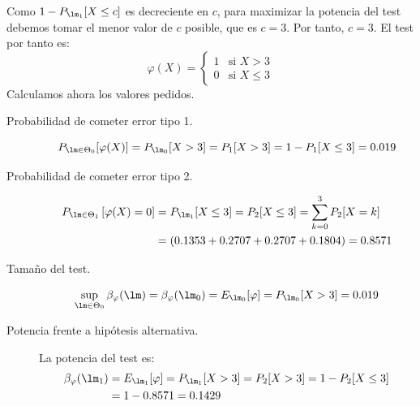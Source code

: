 \begin{ejercicio}
\begin{enumerate}[label=\alph*)]
            Como $1-P_{\lm_1}[X\leq c]$ es decreciente en $c$, para maximizar la potencia del test debemos tomar el menor valor de $c$ posible, que es $c=3$. Por tanto, $c=3$. El test por tanto es:
            \begin{equation*}
                \varphi(X) = \left\{\begin{array}{ll}
                    1 & \text{si\ } X> 3 \\
                    0 & \text{si\ } X \leq 3
                \end{array}\right. 
            \end{equation*}
            Calculamos ahora los valores pedidos.
            \begin{description}
                \item [Probabilidad de cometer error tipo 1.] 
                    \begin{equation*}
                        P_{\lm\in \Theta_0}[\varphi(X)] = P_{\lm_0}[X>3] = P_1[X>3] = 1-P_1[X\leq 3] = 0.019
                    \end{equation*}
                \item [Probabilidad de cometer error tipo 2.]
                    \begin{align*}
                        P_{\lm \in \Theta_1}\left[\varphi(X)=0\right] &= P_{\lm_1}[X\leq 3] = P_2[X\leq 3] = \sum_{k=0}^{3} P_2[X=k] \\
                                                                           &= (0.1353 + 0.2707 + 0.2707 + 0.1804) = 0.8571
                    \end{align*}
                \item [Tamaño del test.]
                    \begin{equation*}
                        \sup_{\lm \in \Theta_0}\beta_\varphi(\lm) = \beta_\varphi(\lm_0) = E_{\lm_0}[\varphi] = P_{\lm_0}[X>3] = 0.019
                    \end{equation*}
                \item [Potencia frente a hipótesis alternativa.] La potencia del test es:
                    \begin{align*}
                        \beta_\varphi(\lm_1) &= E_{\lm_1}[\varphi] = P_{\lm_1}[X>3] = P_2[X>3] = 1-P_2[X\leq 3] \\
                                                                   &= 1- 0.8571 = 0.1429
                    \end{align*}
            \end{description}

\end{enumerate}
\end{ejercicio}
